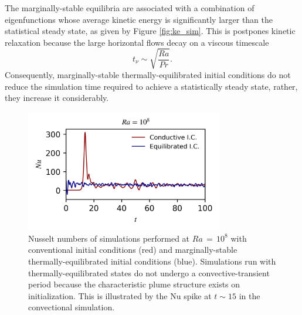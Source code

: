 \documentclass[reprint,amsmath,amssymb,aps]{revtex4-1}
\newcommand\Nu{\mathrm{Nu}}
\begin{document}
\par The marginally-stable equilibria are associated with a combination of eigenfunctions whose average kinetic energy is significantly larger than the statistical steady state, as given by Figure \ref{fig:ke_sim}. 
This is postpones kinetic relaxation because the large horizontal flows decay on a viscous timescale
\begin{equation}
    t_{\nu} \sim \sqrt{\frac{Ra}{Pr}}. \nonumber
\end{equation}
Consequently, marginally-stable thermally-equilibrated initial conditions do not reduce the simulation time required to achieve a statistically steady state, rather, they increase it considerably.
\begin{figure}
    \begin{minipage}{3.4in}
        \centering
        \includegraphics[width=3.4in]{sim_eq_nu.png}
        \caption{Nusselt numbers of simulations performed at $Ra \, = \, 10^8$ with conventional initial conditions (red) and marginally-stable thermally-equilibrated initial conditions (blue). 
        Simulations run with thermally-equilibrated states do not undergo a convective-transient period because the characteristic plume structure exists on initialization. 
        This is illustrated by the $\Nu$ spike at $t \sim 15$ in the convectional simulation.}
        \label{fig:nu_sim}
    \end{minipage}
\end{figure}
\end{document}
